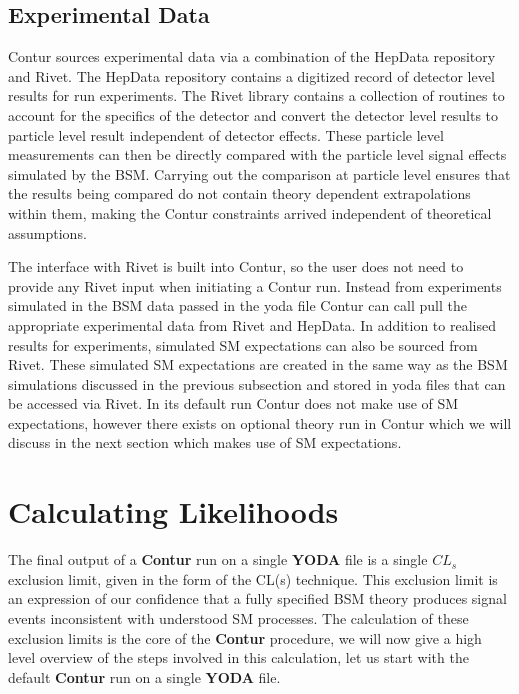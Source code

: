 \subsection{Experimental Data}

Contur sources experimental data via a combination of the HepData\cite{HEPData} repository and Rivet\cite{Rivet}. The HepData repository contains a digitized record of detector level results for run experiments. The Rivet library contains a collection of routines to account for the specifics of the detector and convert the detector level results to particle level result independent of detector effects. These particle level measurements can then be directly compared with the particle level signal effects simulated by the BSM. Carrying out the comparison at particle level ensures that the results being compared do not contain theory dependent extrapolations within them, making the Contur constraints arrived independent of theoretical assumptions. 

The interface with Rivet is built into Contur, so the user does not need to provide any Rivet input when initiating a Contur run. Instead from experiments simulated in the BSM data passed in the yoda file Contur can call pull the appropriate experimental data from Rivet and HepData. In addition to realised results for experiments, simulated SM expectations can also be sourced from Rivet. These simulated SM expectations are created in the same way as the BSM simulations discussed in the previous subsection and stored in yoda files that can be accessed via Rivet. In its default run Contur does not make use of SM expectations, however there exists on optional theory run in Contur which we will discuss in the next section which makes use of SM expectations.


\section{Calculating Likelihoods}\label{calculate_likelihood}

The final output of a \textbf{Contur} run on a single \textbf{YODA} file is a single $CL_s$ exclusion limit, given in the form of the CL(s) technique\cite{cls}. This exclusion limit is an expression of our confidence that a fully specified BSM theory produces signal events inconsistent with understood SM processes.  The calculation of these exclusion limits is the core of the \textbf{Contur} procedure, we will now give a high level overview of the steps involved in this calculation, let us start with the default \textbf{Contur} run on a single \textbf{YODA} file.

